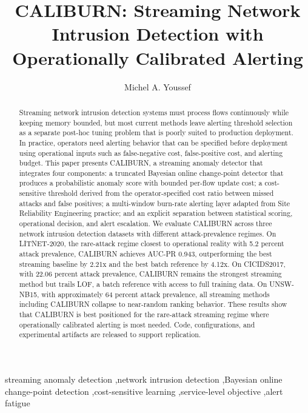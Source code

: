\documentclass[preprint,12pt,authoryear]{elsarticle}
\newcommand{\caliburn}{CALIBURN}
\begin{document}
\begin{frontmatter}

\title{\caliburn{}: Streaming Network Intrusion Detection with Operationally Calibrated Alerting}

\author{Michel A. Youssef}
\address{Independent Researcher, Beirut, Lebanon}

\begin{abstract}
Streaming network intrusion detection systems must process flows continuously while keeping memory bounded, but most current methods leave alerting threshold selection as a separate post-hoc tuning problem that is poorly suited to production deployment. In practice, operators need alerting behavior that can be specified before deployment using operational inputs such as false-negative cost, false-positive cost, and alerting budget. This paper presents \caliburn{}, a streaming anomaly detector that integrates four components: a truncated Bayesian online change-point detector that produces a probabilistic anomaly score with bounded per-flow update cost; a cost-sensitive threshold derived from the operator-specified cost ratio between missed attacks and false positives; a multi-window burn-rate alerting layer adapted from Site Reliability Engineering practice; and an explicit separation between statistical scoring, operational decision, and alert escalation. We evaluate \caliburn{} across three network intrusion detection datasets with different attack-prevalence regimes. On LITNET-2020, the rare-attack regime closest to operational reality with 5.2 percent attack prevalence, \caliburn{} achieves AUC-PR 0.943, outperforming the best streaming baseline by 2.21x and the best batch reference by 4.12x. On CICIDS2017, with 22.06 percent attack prevalence, \caliburn{} remains the strongest streaming method but trails LOF, a batch reference with access to full training data. On UNSW-NB15, with approximately 64 percent attack prevalence, all streaming methods including \caliburn{} collapse to near-random ranking behavior. These results show that \caliburn{} is best positioned for the rare-attack streaming regime where operationally calibrated alerting is most needed. Code, configurations, and experimental artifacts are released to support replication.
\end{abstract}

\begin{keyword}
streaming anomaly detection \sep network intrusion detection \sep Bayesian online change-point detection \sep cost-sensitive learning \sep service-level objective \sep alert fatigue
\end{keyword}

\end{frontmatter}
\end{document}
